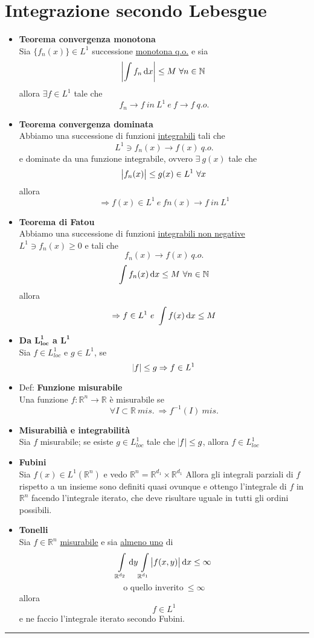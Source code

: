 \documentclass[a4paper,portrait,columns=3,5pt]{cheatsheet}
\begin{document}
\section{Integrazione secondo Lebesgue}
\begin{itemize}
    \item \textbf{Teorema convergenza monotona} \\ Sia $\{ f_n(x) \} \in L^1$ successione \underline{monotona q.o.} e sia $$\abs{\int f_n \dif x} \leq M~\forall n \in \mathbb{N}$$ allora $ \exists f \in L^1$ tale che $$f_n \rightarrow f~ in~ L^1~e~f\rightarrow f~q.o.$$
    \item \textbf{Teorema convergenza dominata}\\ Abbiamo una successione di funzioni \underline{integrabili} tali che $$ L^1 \ni f_n(x) \rightarrow f(x)~q.o.$$ e dominate da una funzione integrabile, ovvero $\exists~g(x)$ tale che $$ \abs{f_n(x)} \leq g(x) \in L^1~\forall x$$ allora $$\Rightarrow f(x) \in L^1 ~ e ~ fn(x) \rightarrow f~in~L^1$$
    \item \textbf{Teorema di Fatou}\\ Abbiamo una successione di funzioni \underline{integrabili non negative} $L^1 \ni f_n(x) \geq 0$ e tali che $$f_n(x) \rightarrow f(x)~q.o.$$ $$\int f_n(x) \dif x \leq M~\forall n\in \mathbb{N}$$ allora $$ \Rightarrow f\in L^1~e~\int f(x) \dif x \leq M$$ 
    \item \textbf{Da $\mathbf{L^1_{loc}}$ a $\mathbf{L^1}$}\\Sia $f\in L^1_{loc}$ e $g\in L^1$, se $$\abs{f} \leq g \Rightarrow f\in L^1$$
    \item Def: \textbf{Funzione misurabile} \\ Una funzione $f:\mathbb{R}^n \rightarrow \mathbb{R}$ è misurabile se $$\forall I\subset \mathbb{R}~mis.~ \Rightarrow f^{-1}(I)~mis.$$ 
    \item \textbf{Misurabilià e integrabilità}\\ Sia $f$ misurabile; se esiste $g\in L^1_{loc}$ tale che $\abs{f} \leq g$, allora $f\in L^1_{loc}$
    \item \textbf{Fubini}\\ Sia $f(x) \in L^1(\mathbb{R}^n)$ e vedo $\mathbb{R}^n = \mathbb{R}^{d_1} \times \mathbb{R}^{d_1}$ Allora gli integrali parziali di $f$ rispetto a un insieme sono definiti quasi ovunque e ottengo l'integrale di $f$ in $\mathbb{R}^{n}$ facendo l'integrale iterato, che deve risultare uguale in tutti gli ordini possibili.
    \item \textbf{Tonelli}\\ Sia $f\in \mathbb{R}^n$ \underline{misurabile} e sia \underline{almeno uno} di $$ \int \limits_{\mathbb{R}^{d_2}} \dif y \int \limits_{\mathbb{R}^{d_1}} \abs{f(x, y)} \dif x \leq \infty $$ $$ \text{o quello inverito}~\leq \infty$$ allora $$f\in L^1$$ e ne faccio l'integrale iterato secondo Fubini.
\end{itemize}
\hrule
\end{document}
